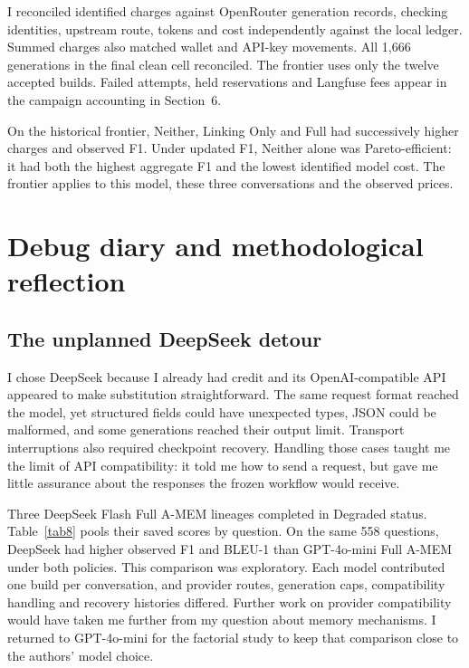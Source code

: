 \documentclass[11pt,a4paper]{article}
\begin{document}
I reconciled identified charges against OpenRouter generation records, checking identities, upstream route, tokens and cost independently against the local ledger. Summed charges also matched wallet and API-key movements. All 1,666 generations in the final clean cell reconciled. The frontier uses only the twelve accepted builds. Failed attempts, held reservations and Langfuse fees appear in the campaign accounting in Section~6.

On the historical frontier, Neither, Linking Only and Full had successively higher charges and observed F1. Under updated F1, Neither alone was Pareto-efficient: it had both the highest aggregate F1 and the lowest identified model cost. The frontier applies to this model, these three conversations and the observed prices.

\section{Debug diary and methodological reflection}
\subsection{The unplanned DeepSeek detour}
I chose DeepSeek because I already had credit and its OpenAI-compatible API appeared to make substitution straightforward. The same request format reached the model, yet structured fields could have unexpected types, JSON could be malformed, and some generations reached their output limit. Transport interruptions also required checkpoint recovery. Handling those cases taught me the limit of API compatibility: it told me how to send a request, but gave me little assurance about the responses the frozen workflow would receive.

Three DeepSeek Flash Full A-MEM lineages completed in Degraded status. Table~\ref{tab8} pools their saved scores by question. On the same 558 questions, DeepSeek had higher observed F1 and BLEU-1 than GPT-4o-mini Full A-MEM under both policies. This comparison was exploratory. Each model contributed one build per conversation, and provider routes, generation caps, compatibility handling and recovery histories differed. Further work on provider compatibility would have taken me further from my question about memory mechanisms. I returned to GPT-4o-mini for the factorial study to keep that comparison close to the authors’ model choice.
\end{document}
